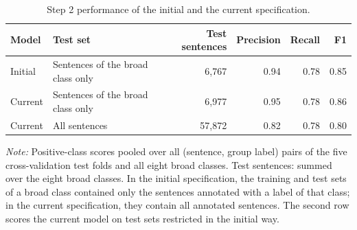 \begin{table}[htb]
\centering
\scriptsize
\begin{threeparttable}
\caption{Step 2 performance of the initial and the current specification.}
\label{tab:step-2-initial-vs-current}
\begin{tabular}{l l r r r r}
\toprule
Model & Test set & Test sentences & Precision & Recall & F1 \\
\midrule
Initial & Sentences of the broad class only & 6,767 & 0.94 & 0.78 & 0.85 \\
Current & Sentences of the broad class only & 6,977 & 0.95 & 0.78 & 0.86 \\
Current & All sentences & 57,872 & 0.82 & 0.78 & 0.80 \\
\bottomrule
\end{tabular}
\begin{tablenotes}[flushleft]
\footnotesize
\item \textit{Note:} Positive-class scores pooled over all (sentence, group label) pairs of the five cross-validation test folds and all eight broad classes. Test sentences: summed over the eight broad classes. In the initial specification, the training and test sets of a broad class contained only the sentences annotated with a label of that class; in the current specification, they contain all annotated sentences. The second row scores the current model on test sets restricted in the initial way.
\end{tablenotes}
\end{threeparttable}
\end{table}
